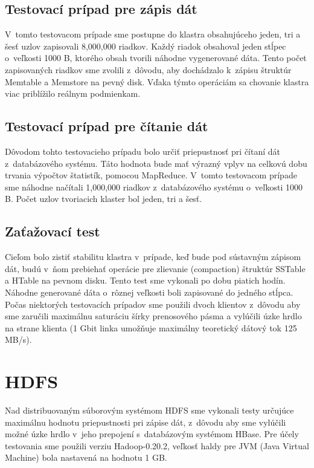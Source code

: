 \documentclass[11pt,twoside,a4paper]{book}
\begin{document}
\subsection{Testovací prípad pre zápis dát}

V~tomto testovacom prípade sme postupne do klastra obsahujúceho jeden, tri a šesť uzlov zapisovali 8,000,000 riadkov. Každý riadok obsahoval jeden stĺpec o~veľkosti 1000 B, ktorého obsah tvorili náhodne vygenerované dáta. Tento počet zapisovaných riadkov sme zvolili z~dôvodu, aby dochádzalo k~zápisu štruktúr Memtable a Memstore na pevný disk. Vďaka týmto operáciám sa chovanie klastra viac priblížilo reálnym podmienkam.

\subsection{Testovací prípad pre čítanie dát}

Dôvodom tohto testovacieho prípadu bolo určiť priepustnosť pri čítaní dát z~databázového systému. Táto hodnota bude mať výrazný vplyv na celkovú dobu trvania výpočtov štatistík, pomocou MapReduce. V~tomto testovacom prípade sme náhodne načítali 1,000,000 riadkov z~databázového systému o~veľkosti 1000 B. Počet uzlov tvoriacich klaster bol jeden, tri a šesť.

\subsection{Zaťažovací test}

Cieľom bolo zistiť stabilitu klastra v~prípade, keď bude pod sústavným zápisom dát, budú v~ňom prebiehať  operácie pre zlievanie (compaction) štruktúr SSTable a HTable na pevnom disku. Tento test sme vykonali po dobu piatich hodín. Náhodne generované dáta o~rôznej veľkosti boli zapisované do jedného stĺpca. Počas niektorých testovacích prípadov sme použili dvoch klientov z~dôvodu aby sme zaručili maximálnu saturáciu šírky prenosového pásma a vylúčili úzke hrdlo na strane klienta (1 Gbit linka umožňuje maximálny teoretický dátový tok 125 MB/s).


\section{HDFS}
Nad distribuovaným súborovým systémom HDFS sme vykonali testy určujúce maximálnu hodnotu priepustnosti pri zápise dát, z~dôvodu aby sme vylúčili možné úzke hrdlo v~jeho prepojení s~databázovým systémom HBase. Pre účely testovania sme použili verziu Hadoop-0.20.2, veľkosť haldy pre JVM (Java Virtual Machine) bola nastavená na hodnotu 1 GB.
\end{document}
